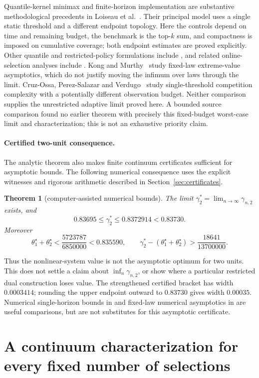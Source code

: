 \documentclass[11pt]{article}
\newtheorem{theorem}{Theorem}
\theoremstyle{remark}
\begin{document}
Quantile-kernel minimax and finite-horizon implementation are substantive methodological precedents in Loiseau et al.~\cite[Section~3, Appendix~C.4]{LMPPV}. Their principal model uses a single static threshold and a different endpoint topology. Here the controls depend on time and remaining budget, the benchmark is the top-$k$ sum, and compactness is imposed on cumulative coverage; both endpoint estimates are proved explicitly. Other quantile and restricted-policy formulations include \cite{PST,GMZ}, and related online-selection analyses include \cite{PSV}. Kong and Murthy~\cite{KM26} study fixed-law extreme-value asymptotics, which do not justify moving the infimum over laws through the limit. Cruz-Ossa, Perez-Salazar and Verdugo~\cite{CPV26} study single-threshold competition complexity with a potentially different observation budget. Neither comparison supplies the unrestricted adaptive limit proved here. A bounded source comparison found no earlier theorem with precisely this fixed-budget worst-case limit and characterization; this is not an exhaustive priority claim.

\paragraph{Certified two-unit consequence.}
The analytic theorem also makes finite continuum certificates sufficient for asymptotic bounds. The following numerical consequence uses the explicit witnesses and rigorous arithmetic described in Section~\ref{sec:certificates}.
\begin{theorem}[computer-assisted numerical bounds]\label{thm:main}
The limit $\gamma_2^*=\lim_{n\to\infty}\gamma_{n,2}$ exists, and
\[
 0.83695\le\gamma_2^*\le0.8372914<0.83730.
\]
Moreover
\[
 \theta_1^\star+\theta_2^\star
 <\frac{5723787}{6850000}<0.835590,\qquad
 \gamma_2^*-(\theta_1^\star+\theta_2^\star)
 >\frac{18641}{13700000}.
\]
\end{theorem}
Thus the nonlinear-system value is not the asymptotic optimum for two units. This does not settle a claim about $\inf_n\gamma_{n,2}$, or show where a particular restricted dual construction loses value. The strengthened certified bracket has width $0.0003414$; rounding the upper endpoint outward to $0.83730$ gives width $0.00035$. Numerical single-horizon bounds in \cite{JMZ,BPV} and fixed-law numerical asymptotics in \cite{KM26} are useful comparisons, but are not substitutes for this asymptotic certificate.

\section{A continuum characterization for every fixed number of selections}
\label{sec:fixed-k-extension}
\end{document}
